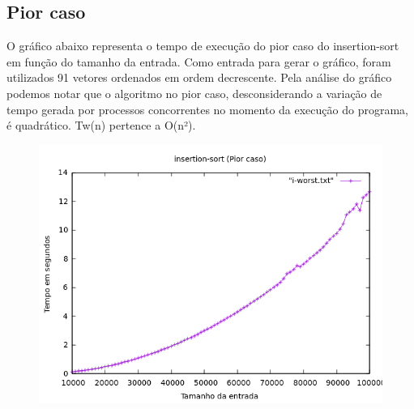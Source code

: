 \subsection{Pior caso}
O gráfico abaixo representa o tempo de execução do pior caso do insertion-sort em função do tamanho da entrada. Como entrada para gerar o gráfico, foram utilizados 91 vetores ordenados em ordem decrescente. Pela análise do gráfico podemos notar que o algoritmo no pior caso, desconsiderando a variação de tempo gerada por processos concorrentes no momento da execução do programa, é quadrático. Tw(n) pertence a O(n²).
\begin{figure}[h]
    \centering
    \includegraphics[width=1\linewidth]{Imagens/i-worst.png}
\end{figure}

\newpage

